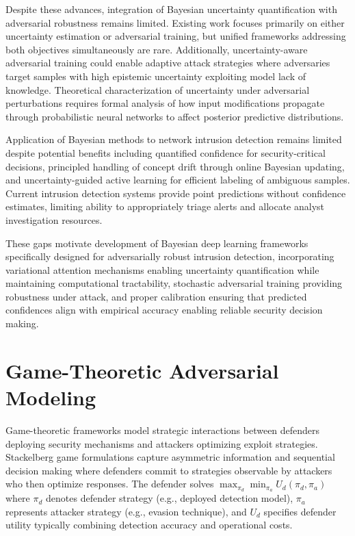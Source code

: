 Despite these advances, integration of Bayesian uncertainty quantification with adversarial robustness remains limited. Existing work focuses primarily on either uncertainty estimation or adversarial training, but unified frameworks addressing both objectives simultaneously are rare. Additionally, uncertainty-aware adversarial training could enable adaptive attack strategies where adversaries target samples with high epistemic uncertainty exploiting model lack of knowledge. Theoretical characterization of uncertainty under adversarial perturbations requires formal analysis of how input modifications propagate through probabilistic neural networks to affect posterior predictive distributions.

Application of Bayesian methods to network intrusion detection remains limited despite potential benefits including quantified confidence for security-critical decisions, principled handling of concept drift through online Bayesian updating, and uncertainty-guided active learning for efficient labeling of ambiguous samples. Current intrusion detection systems provide point predictions without confidence estimates, limiting ability to appropriately triage alerts and allocate analyst investigation resources.

These gaps motivate development of Bayesian deep learning frameworks specifically designed for adversarially robust intrusion detection, incorporating variational attention mechanisms enabling uncertainty quantification while maintaining computational tractability, stochastic adversarial training providing robustness under attack, and proper calibration ensuring that predicted confidences align with empirical accuracy enabling reliable security decision making.

\section{Game-Theoretic Adversarial Modeling}
\label{sec:lit_game_theory}

Game-theoretic frameworks model strategic interactions between defenders deploying security mechanisms and attackers optimizing exploit strategies. Stackelberg game formulations capture asymmetric information and sequential decision making where defenders commit to strategies observable by attackers who then optimize responses. The defender solves $\max_{\pi_d} \min_{\pi_a} U_d(\pi_d, \pi_a)$ where $\pi_d$ denotes defender strategy (e.g., deployed detection model), $\pi_a$ represents attacker strategy (e.g., evasion technique), and $U_d$ specifies defender utility typically combining detection accuracy and operational costs.

